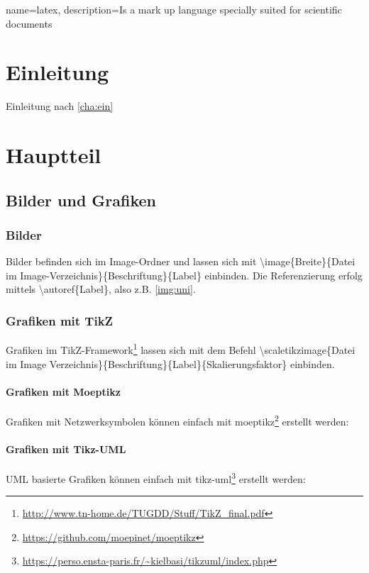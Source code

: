 
{
        name=latex,
        description={Is a mark up language specially suited for
scientific documents}
}

\chapter{Einleitung}\label{cha:ein}
Einleitung nach \autoref{cha:ein}

\chapter{Hauptteil}\label{cha:haupt}
\section{Bilder und Grafiken}\label{sec:grafiken}

\subsection{Bilder}\label{subsec:bilder}
Bilder befinden sich im Image-Ordner und lassen sich mit \textbackslash image\{Breite\}\{Datei im Image-Verzeichnis\}\{Beschriftung\}\{Label\} einbinden.  Die Referenzierung erfolg mittels \textbackslash autoref\{Label\}, also z.B. \autoref{img:uni}.
\subsection{Grafiken mit TikZ}
Grafiken im TikZ-Framework\footnote{\url{http://www.tn-home.de/TUGDD/Stuff/TikZ_final.pdf}} lassen sich mit dem Befehl \textbackslash scaletikzimage\{Datei im Image Verzeichnis\}\{Beschriftung\}\{Label\}\{Skalierungsfaktor\} einbinden. 

\subsubsection{Grafiken mit Moeptikz}
Grafiken mit Netzwerksymbolen können einfach mit moeptikz\footnote{\url{https://github.com/moepinet/moeptikz}} erstellt werden:

\subsubsection{Grafiken mit Tikz-UML}
UML basierte Grafiken können einfach mit tikz-uml\footnote{\url{https://perso.ensta-paris.fr/~kielbasi/tikzuml/index.php}} erstellt werden:

